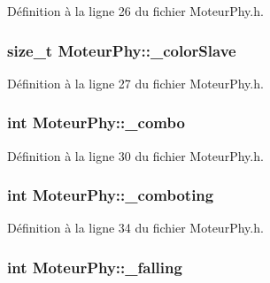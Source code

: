 Définition à la ligne 26 du fichier MoteurPhy.h.

\hypertarget{a00013_a70abfbed5e6126f443c721d185f04952}{
\subsubsection[{\_\-colorSlave}]{\setlength{\rightskip}{0pt plus 5cm}size\_\-t {\bf MoteurPhy::\_\-colorSlave}}}
\label{a00013_a70abfbed5e6126f443c721d185f04952}


Définition à la ligne 27 du fichier MoteurPhy.h.

\hypertarget{a00013_ac03396a1d6630aab8e1124f140ec0209}{
\subsubsection[{\_\-combo}]{\setlength{\rightskip}{0pt plus 5cm}int {\bf MoteurPhy::\_\-combo}}}
\label{a00013_ac03396a1d6630aab8e1124f140ec0209}


Définition à la ligne 30 du fichier MoteurPhy.h.

\hypertarget{a00013_af24fab45cd725cba2bc90d04c45d455f}{
\subsubsection[{\_\-comboting}]{\setlength{\rightskip}{0pt plus 5cm}int {\bf MoteurPhy::\_\-comboting}}}
\label{a00013_af24fab45cd725cba2bc90d04c45d455f}


Définition à la ligne 34 du fichier MoteurPhy.h.

\hypertarget{a00013_acc1309c3ba878730a3767d3d06c6f632}{
\subsubsection[{\_\-falling}]{\setlength{\rightskip}{0pt plus 5cm}int {\bf MoteurPhy::\_\-falling}}}
\label{a00013_acc1309c3ba878730a3767d3d06c6f632}


